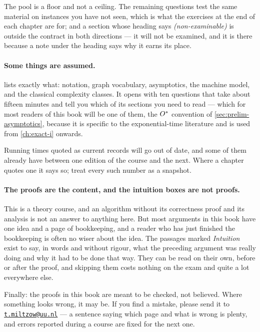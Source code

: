 The pool is a floor and not a ceiling. The remaining questions test the same
material on instances you have not seen, which is what the exercises at the end
of each chapter are for; and a section whose heading says
\emph{(non-examinable)} is outside the contract in both directions --- it will
not be examined, and it is there because a note under the heading says why it
earns its place.

\paragraph{Some things are assumed.}
 lists exactly what: notation, graph vocabulary,
asymptotics, the machine model, and the classical complexity classes. It opens
with ten questions that take about fifteen minutes and tell you which of its
sections you need to read --- which for most readers of this book will be one
of them, the $O^{*}$ convention of \cref{sec:prelim-asymptotics}, because it
is specific to the exponential-time literature and is used from
\cref{ch:exact-i} onwards.

Running times quoted as current records will go out of date, and some of them
already have between one edition of the course and the next. Where a chapter
quotes one it says so; treat every such number as a snapshot.

\paragraph{The proofs are the content, and the intuition boxes are not proofs.}
This is a theory course, and an algorithm without its correctness proof and its
analysis is not an answer to anything here. But most arguments in this book have
one idea and a page of bookkeeping, and a reader who has just finished the
bookkeeping is often no wiser about the idea. The passages marked
\emph{Intuition} exist to say, in words and without rigour, what the preceding
argument was really doing and why it had to be done that way. They can be read
on their own, before or after the proof, and skipping them costs nothing on the
exam and quite a lot everywhere else.

Finally: the proofs in this book are meant to be checked, not believed. Where
something looks wrong, it may be. If you find a mistake, please send it to
\href{mailto:t.miltzow@uu.nl}{\texttt{t.miltzow@uu.nl}} --- a sentence saying
which page and what is wrong is plenty, and errors reported during a course are
fixed for the next one.
